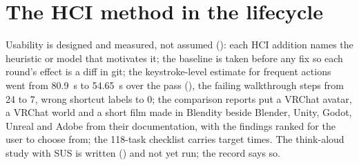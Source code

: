 \section{The HCI method in the lifecycle}
Usability is designed and measured, not assumed (): each HCI addition names the heuristic or model that
motivates it; the baseline is taken before any fix so each round's effect is a diff in git; the keystroke-level
estimate for frequent actions went from 80.9~s to 54.65~s over the pass (), the failing
walkthrough steps from 24 to 7, wrong shortcut labels to 0; the comparison reports put a VRChat avatar, a VRChat world
and a short film made in Blendity beside Blender, Unity, Godot, Unreal and Adobe from their documentation, with the
findings ranked for the user to choose from; the 118-task checklist carries target times. The think-aloud study with
SUS is written () and not yet run; the record says so.

